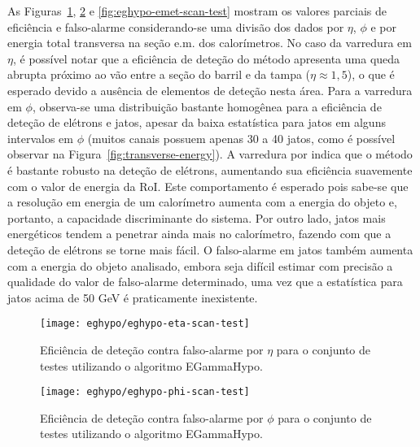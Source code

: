 As Figuras~\ref{fig:eghypo-eta-scan-test}, \ref{fig:eghypo-phi-scan-test} e
\ref{fig:eghypo-emet-scan-test} mostram os valores parciais de eficiência e
falso-alarme considerando-se uma divisão dos dados por $\eta$, $\phi$ e por
energia total transversa na seção e.m. dos calorímetros. No caso da varredura
em $\eta$, é possível notar que a eficiência de deteção do método apresenta
uma queda abrupta próximo ao vão entre a seção do barril e da tampa ($\eta
\approx 1,5$), o que é esperado devido a ausência de elementos de deteção
nesta área. Para a varredura em $\phi$, observa-se uma distribuição bastante
homogênea para a eficiência de deteção de elétrons e jatos, apesar da baixa
estatística para jatos em alguns intervalos em $\phi$ (muitos canais possuem
apenas 30 a 40 jatos, como é possível observar na
Figura~\ref{fig:transverse-energy}). A varredura por \etem indica que o método
é bastante robusto na deteção de elétrons, aumentando sua eficiência
suavemente com o valor de energia da RoI. Este comportamento é esperado pois
sabe-se que a resolução em energia de um calorímetro aumenta com a energia do
objeto \cite{wigmans-book} e, portanto, a capacidade discriminante do
sistema. Por outro lado, jatos mais energéticos tendem a penetrar ainda mais
no calorímetro, fazendo com que a deteção de elétrons se torne mais fácil. O
falso-alarme em jatos também aumenta com a energia do objeto analisado, embora
seja difícil estimar com precisão a qualidade do valor de falso-alarme
determinado, uma vez que a estatística para jatos acima de 50 GeV é
praticamente inexistente.

\begin{figure}
\begin{center}
\texttt{[image: eghypo/eghypo-eta-scan-test]}
\end{center}
\caption{Eficiência de deteção contra falso-alarme por $\eta$ para o conjunto
de testes utilizando o algoritmo EGammaHypo.}
\label{fig:eghypo-eta-scan-test}
\end{figure}

\begin{figure}
\begin{center}
\texttt{[image: eghypo/eghypo-phi-scan-test]}
\end{center}
\caption{Eficiência de deteção contra falso-alarme por $\phi$ para o conjunto
de testes utilizando o algoritmo EGammaHypo.} 
\label{fig:eghypo-phi-scan-test}
\end{figure}

